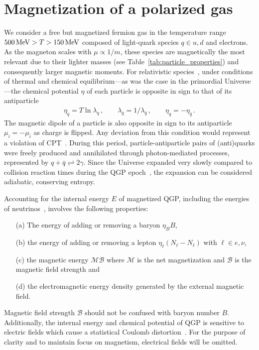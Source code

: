 \documentclass[epjST]{svjour}
\newcommand*{\MeV}{\text{\,MeV}}
\numberwithin{equation}{section}
\begin{document}
\section{Magnetization of a polarized gas}
\label{sec:magnetization}
We consider a free but magnetized fermion gas in the temperature range \(500\MeV>T>150\MeV\) composed of light-quark species \(q \in {u,d}\) and electrons. As the magneton scales with \(\mu \propto 1/m\), these species are magnetically the most relevant due to their lighter masses (see Table~\ref{tab:particle_properties}) and consequently larger magnetic moments. For relativistic species~\cite{Elze:1980er}, under conditions of thermal and chemical equilibrium---as was the case in the primordial Universe---the chemical potential \(\eta\) of each particle is opposite in sign to that of its antiparticle
\begin{align}
    \eta_{q}=T\ln\lambda_{q}\,,\qquad
    \lambda_{q}=1/\lambda_{\bar{q}}\,,\qquad
    \eta_{q}=-\eta_{\bar{q}}\,.
\end{align}
The magnetic dipole of a particle is also opposite in sign to its antiparticle $\mu_{i}=-\mu_{\bar{i}}$ as charge is flipped. Any deviation from this condition would represent a violation of CPT~\cite{Colladay:1996iz,Bluhm:1997ci,BASE:2016yuo}. During this period, particle-antiparticle pairs of (anti)quarks were freely produced and annihilated through photon-mediated processes, represented by $q+\bar{q}\rightleftharpoons2\gamma$. Since the Universe expanded very slowly compared to collision reaction times during the QGP epoch~\cite{Rafelski:2023emw,Yang:2024ret}, the expansion can be considered adiabatic, conserving entropy.

Accounting for the internal energy $E$ of magnetized QGP, including the energies of neutrinos~\cite{Birrell:2014ona}, involves the following properties: 
\begin{itemize}
    \item[(a)] The energy of adding or removing a baryon $\eta_{B}B$,
    \item[(b)] the energy of adding or removing a lepton $\eta_{\ell}(N_{\ell}-N_{\ell})$ with $\ell\in {e,\nu}$, 
    \item[(c)] the magnetic energy $\mathcal{M}\mathcal{B}$ where $\mathcal{M}$ is the net magnetization and $\mathcal{B}$ is the magnetic field strength and
    \item[(d)] the electromagnetic energy density generated by the external magnetic field.
\end{itemize}
Magnetic field strength $\mathcal{B}$ should not be confused with baryon number $B$. Additionally, the internal energy and chemical potential of QGP is sensitive to electric fields which cause a statistical Coulomb distortion~\cite{Sigl:1996dm,Letessier:2002ony}. For the purpose of clarity and to maintain focus on magnetism, electrical fields will be omitted.
\end{document}
